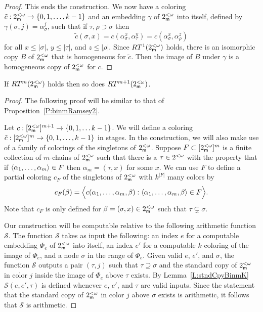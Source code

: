 \begin{proof}
This ends the construction.
We now have a coloring $\tilde{c}:2^{<\omega}_{\mathsf{m}}\to\{0,1,\ldots,k-1\}$
and an embedding $\gamma$ of $2^{<\omega}_{\mathsf{m}}$ into itself,
defined by $\gamma(\sigma,j)=\alpha^j_\sigma$,
such that if $\tau,\rho\supset\sigma$ then
$$\tilde{c}(\sigma,x)=c(\alpha_\sigma^x,\alpha_\tau^y)=c(\alpha_\sigma^x,\alpha_\rho^z)$$
for all $x\leq|\sigma|$, $y\leq|\tau|$, and $z\leq|\rho|$.
Since $RT^1(2^{<\omega}_{\mathsf{m}})$ holds, there is an isomorphic copy
$B$ of $2^{<\omega}_{\mathsf{m}}$ that is homogeneous for $\tilde{c}$.
Then the image of $B$ under $\gamma$ is a homogeneous
copy of $2^{<\omega}_{\mathsf{m}}$ for $c$.
\end{proof}

\begin{prop}\label{P:binmRamseyInduct}
If $RT^{m}(2^{<\omega}_{\mathsf{m}})$ holds then so does $RT^{m+1}(2^{<\omega}_{\mathsf{m}})$.
\end{prop}
\begin{proof}
The following proof will be similar to that of Proposition~\ref{P:binmRamsey2}.

Let $c:[2^{<\omega}_{\mathsf{m}}]^{m+1}\to\{0,1,\ldots k-1\}$.
We will define a coloring $\tilde{c}:[2^{<\omega}_{\mathsf{m}}]^m\to\{0,1,\ldots,k-1\}$ in stages.
In the construction, we will also make use of a family of colorings of the singletons of $2^{<\omega}_{\mathsf{m}}$.
Suppose $F\subset[2^{<\omega}_{\mathsf{m}}]^m$ is a finite collection of $m$-chains of $2^{<\omega}_{\mathsf{m}}$
such that there is a $\tau\in2^{<\omega}$ with the property that if
$\left\langle \alpha_1,\ldots,\alpha_m\right\rangle\in F$ then $\alpha_m=(\tau,x)$ for some $x$.
We can use $F$ to define a partial coloring $c_F$ of the singletons of $2^{<\omega}_{\mathsf{m}}$
with $k^{|F|}$ many colors by
$$c_F(\beta)=\Big\langle c(\alpha_{1},\ldots,\alpha_{m},\beta):\left\langle \alpha_{1},\ldots,\alpha_{m},\beta\right\rangle\in F \Big\rangle.$$
Note that $c_F$ is only defined for $\beta=(\sigma,x)\in2^{<\omega}_{\mathsf{m}}$ such that $\tau\subsetneq\sigma$.

Our construction will be computable relative to the following
arithmetic function $\mathcal{S}$.
The function $\mathcal{S}$ takes as input the following:
an index $e$ for a computable embedding $\Phi_e$ of $2^{<\omega}_{\mathsf{m}}$ into itself,
an index $e'$ for a computable $k$-coloring of the image of $\Phi_e$,
and a node $\sigma$ in the range of $\Phi_e$.
Given valid $e$, $e'$, and $\sigma$, the function $\mathcal{S}$
outputs a pair $(\tau,j)$ such that $\tau\supseteq\sigma$
and the standard copy of $2^{<\omega}_{\mathsf{m}}$ in color $j$ inside the image of $\Phi_e$
above $\tau$ exists.
By Lemma~\ref{L:stndCpyBinmK} $\mathcal{S}(e,e',\tau)$ is defined
whenever $e$, $e'$, and $\tau$ are valid inputs.
Since the statement that the standard copy of $2^{<\omega}_{\mathsf{m}}$ in color $j$ above $\sigma$ exists
is arithmetic, it follows that $\mathcal{S}$ is arithmetic.


\end{proof}
